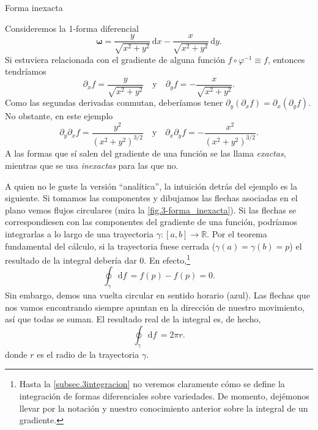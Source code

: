\begin{example}
    {Forma inexacta
    \label{ej.3-formainexacta}}
    
    Consideremos la 1-forma diferencial 
    \begin{equation*}
        \boldsymbol{\omega} = \frac{y}{\sqrt{x^2+y^2}}\,\mathrm{d}x - \frac{x}{\sqrt{x^2+y^2}}\, \mathrm{d}y. 
    \end{equation*}
    Si estuviera relacionada con el gradiente de alguna función \(f\circ\varphi^{-1}\equiv f\), entonces tendríamos
    \begin{equation*}
    \partial_x f = \frac{y}{\sqrt{x^2+y^2}}\quad\text{y}\quad\partial_y f = -\frac{x}{\sqrt{x^2+y^2}}.  
    \end{equation*}
    Como las segundas derivadas conmutan, deberíamos tener \(\partial_y(\partial_x f)= \partial_x(\partial_y f)\). No obstante, en este ejemplo 
    \begin{equation*}
    \partial_y\partial_x f = \frac{y^2}{\left(x^2+y^2\right)^{3/2}}\quad\text{y}\quad\partial_x\partial_y f = -\frac{x^2}{\left(x^2+y^2\right)^{3/2}}.  
    \end{equation*}
    A las formas que sí salen del gradiente de una función se las llama \emph{exactas}, mientras que se usa \emph{inexactas} para las que no.    

    A quien no le guste la versión ``analítica'', la intuición detrás del ejemplo es la siguiente. Si tomamos las componentes y dibujamos las flechas asociadas en el plano vemos flujos circulares (mira la \cref{fig.3-forma_inexacta}). Si las flechas se correspondiesen con las componentes del gradiente de una función, podríamos integrarlas a lo largo de una trayectoria \(\gamma:[a, b]\rightarrow\mathbb{R}\). Por el teorema fundamental del cálculo, si la trayectoria fuese cerrada (\(\gamma(a)=\gamma(b) = p\)) el resultado de la integral debería dar 0. En efecto,\footnote{Hasta la \cref{subsec.3integracion} no veremos claramente cómo se define la integración de formas diferenciales sobre variedades. De momento, dejémonos llevar por la notación y nuestro conocimiento anterior sobre la integral de un gradiente.}
    \begin{equation*}
        \oint_\gamma \mathrm{d}f\, = f(p)-f(p) = 0.
    \end{equation*} 
    Sin embargo, demos una vuelta circular en sentido horario (azul). Las flechas que nos vamos encontrando siempre apuntan en la dirección de nuestro movimiento, así que todas se suman. El resultado real de la integral es, de hecho,  
    \begin{equation*}
        \oint_\gamma \mathrm{d}f\, = 2\pi r.
    \end{equation*} 
    donde \(r\) es el radio de la trayectoria \(\gamma\). 


\end{example}

